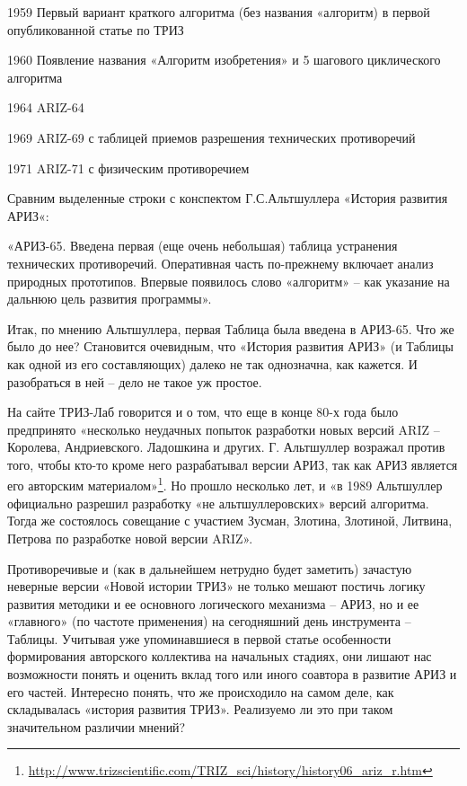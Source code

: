 \documentclass[11pt,a4paper]{article}
\begin{document}
1959 Первый вариант краткого алгоритма (без названия «алгоритм) в первой
опубликованной статье по ТРИЗ

1960 Появление названия «Алгоритм изобретения» и 5 шагового циклического
алгоритма

1964 ARIZ-64

1969 ARIZ-69 с таблицей приемов разрешения технических противоречий

1971 ARIZ-71 с физическим противоречием

Сравним выделенные строки с конспектом Г.С.Альтшуллера «История развития
АРИЗ«:

«АРИЗ-65. Введена первая (еще очень небольшая) таблица устранения технических
противоречий. Оперативная часть по-прежнему включает анализ природных
прототипов. Впервые появилось слово «алгоритм» -- как указание на дальнюю цель
развития программы».

Итак, по мнению Альтшуллера, первая Таблица была введена в АРИЗ-65. Что же
было до нее? Становится очевидным, что «История развития АРИЗ» (и Таблицы как
одной из его составляющих) далеко не так однозначна, как кажется. И
разобраться в ней -- дело не такое уж простое.

На сайте ТРИЗ-Лаб говорится и о том, что еще в конце 80-х года было
предпринято «несколько неудачных попыток разработки новых версий ARIZ --
Королева, Андриевского. Ладошкина и других. Г. Альтшуллер возражал против
того, чтобы кто-то кроме него разрабатывал версии АРИЗ, так как АРИЗ является
его авторским
материалом»\footnote{\url{http://www.trizscientific.com/TRIZ_sci/history/history06_ariz_r.htm}}.
Но прошло несколько лет, и «в 1989 Альтшуллер официально разрешил разработку
«не альтшуллеровских» версий алгоритма. Тогда же состоялось совещание с
участием Зусман, Злотина, Злотиной, Литвина, Петрова по разработке новой
версии ARIZ».

Противоречивые и (как в дальнейшем нетрудно будет заметить) зачастую неверные
версии «Новой истории ТРИЗ» не только мешают постичь логику развития методики
и ее основного логического механизма -- АРИЗ, но и ее «главного» (по частоте
применения) на сегодняшний день инструмента -- Таблицы. Учитывая уже
упоминавшиеся в первой статье особенности формирования авторского коллектива
на начальных стадиях, они лишают нас возможности понять и оценить вклад того
или иного соавтора в развитие АРИЗ и его частей. Интересно понять, что же
происходило на самом деле, как складывалась «история развития
ТРИЗ». Реализуемо ли это при таком значительном различии мнений?
\end{document}
